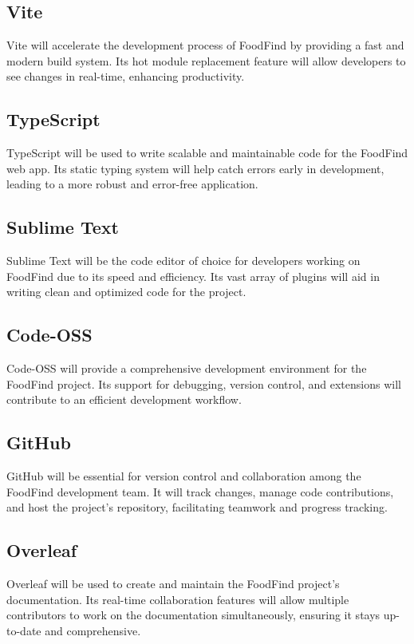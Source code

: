 \documentclass[12pt, a4paper, oneside]{article}
\begin{document}
  \subsection{Vite}
    Vite will accelerate the development process of FoodFind by providing a fast and modern build system. Its hot module replacement feature will allow developers to see changes in real-time, enhancing productivity.

  \subsection{TypeScript}
    TypeScript will be used to write scalable and maintainable code for the FoodFind web app. Its static typing system will help catch errors early in development, leading to a more robust and error-free application.

  \subsection{Sublime Text}
    Sublime Text will be the code editor of choice for developers working on FoodFind due to its speed and efficiency. Its vast array of plugins will aid in writing clean and optimized code for the project.

  \subsection{Code-OSS}
    Code-OSS will provide a comprehensive development environment for the FoodFind project. Its support for debugging, version control, and extensions will contribute to an efficient development workflow.

   \subsection{GitHub}
     GitHub will be essential for version control and collaboration among the FoodFind development team. It will track changes, manage code contributions, and host the project's repository, facilitating teamwork and progress tracking.

   \subsection{Overleaf}
     Overleaf will be used to create and maintain the FoodFind project's documentation. Its real-time collaboration features will allow multiple contributors to work on the documentation simultaneously, ensuring it stays up-to-date and comprehensive.
\pagebreak
\end{document}
